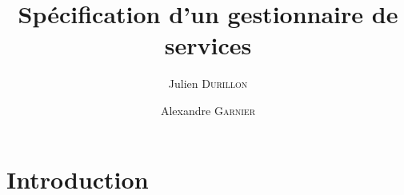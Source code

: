 \documentclass[french, 11pt, a4paper]{article}
\author{Julien \textsc{Durillon} \and Alexandre \textsc{Garnier}}
\title{Spécification d'un gestionnaire de services}
\begin{document}
\maketitle



\section{Introduction}



\section{}
\end{document}
